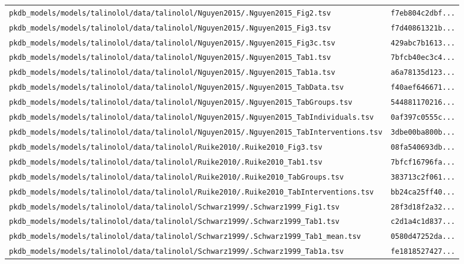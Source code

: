 \begin{longtable}{ll}
\texttt{pkdb\_models/models/talinolol/data/talinolol/Nguyen2015/.Nguyen2015\_Fig2.tsv} & \texttt{f7eb804c2dbf...} \\
\texttt{pkdb\_models/models/talinolol/data/talinolol/Nguyen2015/.Nguyen2015\_Fig3.tsv} & \texttt{f7d40861321b...} \\
\texttt{pkdb\_models/models/talinolol/data/talinolol/Nguyen2015/.Nguyen2015\_Fig3c.tsv} & \texttt{429abc7b1613...} \\
\texttt{pkdb\_models/models/talinolol/data/talinolol/Nguyen2015/.Nguyen2015\_Tab1.tsv} & \texttt{7bfcb40ec3c4...} \\
\texttt{pkdb\_models/models/talinolol/data/talinolol/Nguyen2015/.Nguyen2015\_Tab1a.tsv} & \texttt{a6a78135d123...} \\
\texttt{pkdb\_models/models/talinolol/data/talinolol/Nguyen2015/.Nguyen2015\_TabData.tsv} & \texttt{f40aef646671...} \\
\texttt{pkdb\_models/models/talinolol/data/talinolol/Nguyen2015/.Nguyen2015\_TabGroups.tsv} & \texttt{544881170216...} \\
\texttt{pkdb\_models/models/talinolol/data/talinolol/Nguyen2015/.Nguyen2015\_TabIndividuals.tsv} & \texttt{0af397c0555c...} \\
\texttt{pkdb\_models/models/talinolol/data/talinolol/Nguyen2015/.Nguyen2015\_TabInterventions.tsv} & \texttt{3dbe00ba800b...} \\
\texttt{pkdb\_models/models/talinolol/data/talinolol/Ruike2010/.Ruike2010\_Fig3.tsv} & \texttt{08fa540693db...} \\
\texttt{pkdb\_models/models/talinolol/data/talinolol/Ruike2010/.Ruike2010\_Tab1.tsv} & \texttt{7bfcf16796fa...} \\
\texttt{pkdb\_models/models/talinolol/data/talinolol/Ruike2010/.Ruike2010\_TabGroups.tsv} & \texttt{383713c2f061...} \\
\texttt{pkdb\_models/models/talinolol/data/talinolol/Ruike2010/.Ruike2010\_TabInterventions.tsv} & \texttt{bb24ca25ff40...} \\
\texttt{pkdb\_models/models/talinolol/data/talinolol/Schwarz1999/.Schwarz1999\_Fig1.tsv} & \texttt{28f3d18f2a32...} \\
\texttt{pkdb\_models/models/talinolol/data/talinolol/Schwarz1999/.Schwarz1999\_Tab1.tsv} & \texttt{c2d1a4c1d837...} \\
\texttt{pkdb\_models/models/talinolol/data/talinolol/Schwarz1999/.Schwarz1999\_Tab1\_mean.tsv} & \texttt{0580d47252da...} \\
\texttt{pkdb\_models/models/talinolol/data/talinolol/Schwarz1999/.Schwarz1999\_Tab1a.tsv} & \texttt{fe1818527427...} \\

\end{longtable}
